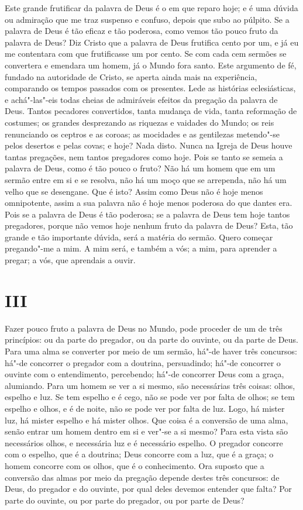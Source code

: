 Este grande frutificar da palavra de Deus é o em que reparo hoje; e é
uma dúvida ou admiração que me traz suspenso e confuso, depois que
subo ao púlpito. Se a palavra de Deus é tão eficaz e tão poderosa, como
vemos tão pouco fruto da palavra de Deus? Diz Cristo que a palavra de
Deus frutifica cento por um, e já eu me contentara com que frutificasse
um por cento. Se com cada cem sermões se convertera e emendara um homem,
já o Mundo fora santo. Este argumento de fé, fundado na autoridade de
Cristo, se
aperta ainda mais na experiência, comparando os tempos passados com os
presentes. Lede as histórias eclesiásticas, e achá"-las"-eis todas cheias
de admiráveis efeitos da pregação da palavra de Deus. Tantos pecadores
convertidos, tanta mudança de vida, tanta reformação de costumes; os
grandes desprezando as riquezas e vaidades do Mundo; os reis renunciando
os ceptros e as coroas; as mocidades e as gentilezas metendo"-se pelos
desertos e pelas covas; e hoje? Nada disto. Nunca na Igreja de Deus
houve tantas pregações, nem tantos pregadores como hoje. Pois se tanto
se semeia a palavra de Deus, como é tão pouco o fruto? Não há um homem
que em um sermão entre em si e se resolva, não há um moço que se
arrependa, não há um velho que se desengane. Que é isto? Assim como Deus
não é hoje menos omnipotente, assim a sua palavra não é hoje menos
poderosa do que dantes era. Pois se a palavra de Deus é tão poderosa; se
a palavra de Deus tem hoje tantos pregadores, porque não vemos hoje
nenhum fruto da palavra de Deus? Esta, tão grande e tão importante
dúvida, será a matéria do sermão. Quero começar pregando"-me a mim. A mim
será, e também a vós; a mim, para aprender a pregar; a vós, que
aprendais a ouvir.

\section{III}

Fazer pouco fruto a palavra de Deus no Mundo, pode proceder de um de
três princípios: ou da parte do pregador, ou da parte do ouvinte, ou da
parte de Deus. Para uma alma se converter por meio de um sermão, há"-de
haver três concursos: há"-de concorrer o pregador com a doutrina,
persuadindo; há"-de concorrer o ouvinte com o entendimento, percebendo;
há"-de concorrer Deus com a graça, alumiando. Para um homem se ver a si
mesmo, são necessárias três coisas: olhos, espelho e luz. Se tem
espelho e é cego, não se pode ver por falta de olhos; se tem espelho e
olhos, e é de noite, não se pode ver por falta de luz. Logo, há mister
luz, há mister espelho e há mister olhos. Que coisa é a conversão de uma
alma, senão entrar um homem dentro em si e ver"-se a si mesmo? Para esta
vista são necessários olhos, e necessária luz e é necessário espelho.
O pregador concorre com o espelho, que é a doutrina; Deus concorre com a
luz, que é a graça; o homem concorre com
os olhos, que é o conhecimento. Ora suposto que a conversão das almas
por meio da pregação depende destes três concursos: de Deus, do pregador
e do ouvinte, por qual deles devemos entender que falta? Por parte do
ouvinte, ou por parte do pregador, ou por parte de Deus?


